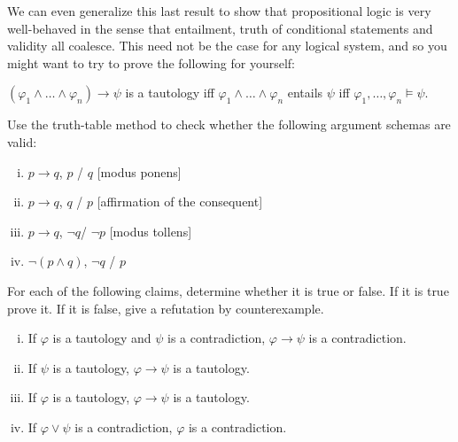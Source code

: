 \documentclass[nobib,nofonts]{tufte-handout}
\newcommand{\mygray}[1]{\textcolor{mygray2}{#1}}
\begin{document}
We can even generalize this last result to show that propositional logic is very well-behaved in the sense that entailment, truth of conditional statements and validity all coalesce.
This need not be the case for any logical system, and so you might want to try to prove the following for yourself:

\begin{proposition}
  $(\varphi_{1} \wedge \dots \wedge \varphi_{n}) \rightarrow \psi$ is a tautology iff
  $\varphi_{1} \wedge \dots \wedge \varphi_{n}$ entails $\psi$ iff
  $\varphi_{1}, \dots, \varphi_{n} \models \psi$.
\end{proposition}



\bigskip
\noindent \colorbox{mygray}{\centering
  \begin{minipage}{1.0\textwidth}

    \begin{exercise}
      Use the truth-table method to check whether the following argument schemas are valid:
      \begin{enumerate}[(i)]
        \item $p \rightarrow q$, $p$ / $q$ \hfill [\mygray{modus ponens}]
        \item $p \rightarrow q$, $q$ / $p$ \hfill [\mygray{affirmation of the consequent}]
        \item $p \rightarrow q$, $\neg q$/ $\neg p$ \hfill [\mygray{modus tollens}]
        \item $\neg(p \wedge q)$, $\neg q$ / $p$
      \end{enumerate}
    \end{exercise}

    \begin{exercise}
      For each of the following claims, determine whether it is true or false. If it is true prove it. If it is false, give a refutation by counterexample.
      \begin{enumerate}[(i)]
        \item If $\varphi$ is a tautology and $\psi$ is a contradiction,  $\varphi \rightarrow \psi$ is a contradiction.
        \item If $\psi$ is a tautology,  $\varphi \rightarrow \psi$ is a tautology.
        \item If $\varphi$ is a tautology,  $\varphi \rightarrow \psi$ is a tautology.
        \item If $\varphi \vee \psi$ is a contradiction,  $\varphi$ is a contradiction.
      \end{enumerate}
    \end{exercise}
  \end{minipage}
}
\end{document}
